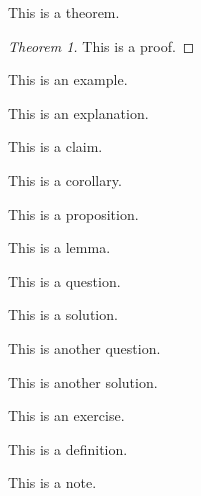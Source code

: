 \documentclass[DIV=14,titlepage=false]{scrreprt}
\begin{document}
\newpage
\begin{theorem}
  This is a theorem.
  \end{theorem}
  \begin{proof}[Theorem 1]
  This is a proof.
  \end{proof}
  \begin{example}
  This is an example.
  \end{example}
  \begin{explanation}
  This is an explanation.
  \end{explanation}
  \begin{claim}
  This is a claim.
  \end{claim}
  \begin{corollary}
  This is a corollary.
  \end{corollary}
  \begin{prop}
  This is a proposition.
  \end{prop}
  \begin{lemma}
  This is a lemma.
  \end{lemma}
  \begin{question}
  This is a question.
  \end{question}
  \begin{solution}
  This is a solution.
  \end{solution}
   \begin{question}
  This is another question.
  \end{question}
  \begin{solution}
  This is another solution.
  \end{solution}
  \begin{exercise}
  This is an exercise.
  \end{exercise}
  \begin{definition}[Test]
  This is a definition.
  \end{definition}
  \begin{note}
  This is a note.
  \end{note}
\end{document}
